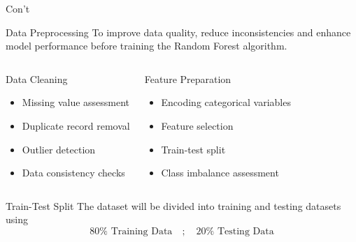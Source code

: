 \documentclass[10pt]{beamer}
\begin{document}
\begin{frame}{Con't}
	
	\small
	
	\begin{block}{Data Preprocessing}
		To improve data quality, reduce inconsistencies and enhance model performance before training the Random Forest algorithm.
	\end{block}
	
	\vspace{0.3cm}
	
	\begin{columns}
		
		
		\begin{alertblock}{Data Cleaning}
			\begin{itemize}
				\item Missing value assessment
				
				\item Duplicate record removal
				
				\item Outlier detection
				
				\item Data consistency checks
			\end{itemize}
		\end{alertblock}
		
		
		\begin{exampleblock}{Feature Preparation}
			\begin{itemize}
				\item Encoding categorical variables
				
				\item Feature selection
				
				\item Train-test split
				
				\item Class imbalance assessment
			\end{itemize}
		\end{exampleblock}
		
	\end{columns}
	
	\vspace{0.3cm}
	
	\begin{block}{Train-Test Split}
		The dataset will be divided into training and testing datasets using
		\[
		80\% \text{ Training Data} \quad ; \quad 20\% \text{ Testing Data}
		\]
	\end{block}
	
\end{frame}
\end{document}

